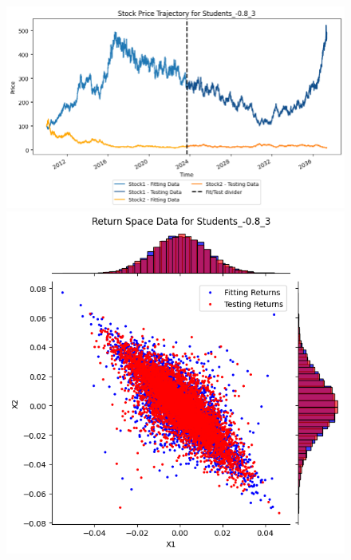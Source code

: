 \begin{figure}
\begin{minipage}{0.9\textwidth}
\begin{minipage}{0.34\textwidth}
        \end{minipage}
    \end{minipage}
    \hfill
    \begin{minipage}{0.9\textwidth}
        \centering
        \begin{minipage}{0.54\textwidth}
            \centering
            \includegraphics[width=\textwidth]{4Method/pictures/PricesStudents_-08_3.png}
        \end{minipage}
        \hfill
        \begin{minipage}{0.34\textwidth}
            \centering
            \includegraphics[width=\textwidth]{4Method/pictures/ReturnsStudents_-08_3.png}

\end{minipage}
\end{minipage}
\end{figure}
